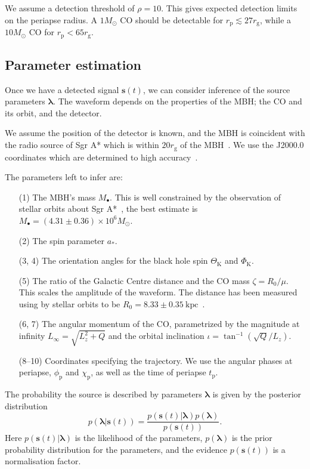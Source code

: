 \documentclass[useAMS,usedcolumn,usegraphicx,usenatbib]{mn2e}
\newcommand{\sub}[1]{\ensuremath{_\mathrm{#1}}}
\begin{document}
We assume a detection threshold of $\rho = 10$. This gives expected detection limits on the periapse radius. A $1 M_\odot$ CO should be detectable for $r\sub{p} \lesssim 27 r\sub{g}$, while a $10 M_\odot$ CO for $r\sub{p} < 65 r\sub{g}$.

\subsection{Parameter estimation}

Once we have a detected signal $\boldsymbol{s}(t)$, we can consider inference of the source parameters $\boldsymbol{\lambda}$. The waveform depends on the properties of the MBH; the CO and its orbit, and the detector.

We assume the position of the detector is known, and the MBH is coincident with the radio source of Sgr A* which is within $20 r_\mathrm{g}$ of the MBH~\citep{Reid2003,Doeleman2008}. We use the J2000.0 coordinates which are determined to high accuracy~\citep{Reid1999, Yusef-Zadeh1999}.

The parameters left to infer are:
\begin{enumerate}
\item[(1)] The MBH's mass $M_\bullet$. This is well constrained by the observation of stellar orbits about Sgr A*~\citep{Ghez2008, Gillessen2009}, the best estimate is $M_\bullet = (4.31 \pm 0.36) \times 10^6 M_\odot$.
\item[(2)] The spin parameter $a_\ast$.
\item[(3, 4)] The orientation angles for the black hole spin $\Theta_\mathrm{K}$ and $\Phi_\mathrm{K}$.
\item[(5)] The ratio of the Galactic Centre distance and the CO mass $\zeta = R_0/\mu$. This scales the amplitude of the waveform. The distance has been measured using by stellar orbits to be $R_0 = 8.33 \pm 0.35~\mathrm{kpc}$~\citep{Gillessen2009}.
\item[(6, 7)] The angular momentum of the CO, parametrized by the magnitude at infinity $L_\infty = \sqrt{L_z^2 + Q}$ and the orbital inclination $\iota = \tan^{-1}(\sqrt{Q}/L_z)$.
\item[(8--10)] Coordinates specifying the trajectory. We use the angular phases at periapse, $\phi_\mathrm{p}$ and $\chi_\mathrm{p}$, as well as the time of periapse $t_\mathrm{p}$.
\end{enumerate}

The probability the source is described by parameters $\boldsymbol{\lambda}$ is given by the posterior distribution
\begin{equation}
p(\boldsymbol{\lambda}|\boldsymbol{s}(t)) = \frac{p(\boldsymbol{s}(t)|\boldsymbol{\lambda})p(\boldsymbol{\lambda})}{p(\boldsymbol{s}(t))}.
\end{equation}
Here $p(\boldsymbol{s}(t)|\boldsymbol{\lambda})$ is the likelihood of the parameters, $p(\boldsymbol{\lambda})$ is the prior probability distribution for the parameters, and the evidence $p(\boldsymbol{s}(t))$ is a normalisation factor.
\end{document}
